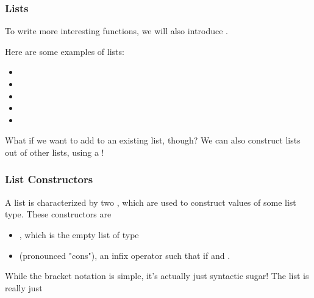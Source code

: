 \documentclass[aspectratio=169]{beamer}
\begin{document}
\begin{frame}[fragile]
  \frametitle{Lists}

  To write more interesting functions, we will also introduce .

  \vspace{\fill}


  \vspace{\fill}

  Here are some examples of lists:
  \begin{itemize}
    \item {}
    \item {}
    \item {}
    \item {}
    \item {}
  \end{itemize}

  \vspace{\fill}
  
  What if we want to add to an existing list, though? We can also construct lists out of other lists, using a !
\end{frame}

\begin{frame}[fragile]
  \frametitle{List Constructors}

  A list is characterized by two , which are used to construct
  values of some list type. These constructors are 
  \begin{itemize}
    \item \code{[]}\footnotemark, which is the empty list of type 
    \item \code{::} (pronounced "cons"), an infix operator such that 
     if  and .
  \end{itemize}

  \vspace{\fill}

  While the bracket notation is simple, it's actually just syntactic sugar! The 
  list \code{[1, 2, 3]} is really just 

  \vspace{\fill}


\end{frame}
\end{document}
